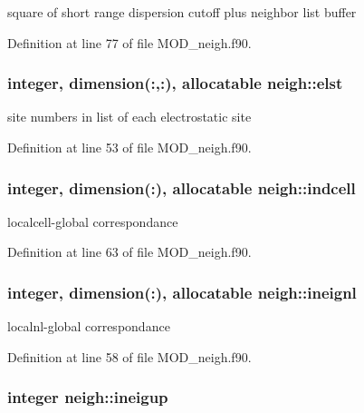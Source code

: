 square of short range dispersion cutoff plus neighbor list buffer 



Definition at line 77 of file M\-O\-D\-\_\-neigh.\-f90.

\hypertarget{classneigh_ab05aa2b85614fd0d577bedd72c64317f}{
\subsubsection[{elst}]{\setlength{\rightskip}{0pt plus 5cm}integer, dimension(\-:,\-:), allocatable neigh\-::elst}}\label{classneigh_ab05aa2b85614fd0d577bedd72c64317f}


site numbers in list of each electrostatic site 



Definition at line 53 of file M\-O\-D\-\_\-neigh.\-f90.

\hypertarget{classneigh_a428039ca05098106f98a9b60f506b247}{
\subsubsection[{indcell}]{\setlength{\rightskip}{0pt plus 5cm}integer, dimension(\-:), allocatable neigh\-::indcell}}\label{classneigh_a428039ca05098106f98a9b60f506b247}


localcell-\/global correspondance 



Definition at line 63 of file M\-O\-D\-\_\-neigh.\-f90.

\hypertarget{classneigh_aea3521da43e6d88ae7b00dba06240210}{
\subsubsection[{ineignl}]{\setlength{\rightskip}{0pt plus 5cm}integer, dimension(\-:), allocatable neigh\-::ineignl}}\label{classneigh_aea3521da43e6d88ae7b00dba06240210}


localnl-\/global correspondance 



Definition at line 58 of file M\-O\-D\-\_\-neigh.\-f90.

\hypertarget{classneigh_a91014fd28ce5849e5f8665c6b4d6f100}{
\subsubsection[{ineigup}]{\setlength{\rightskip}{0pt plus 5cm}integer neigh\-::ineigup}}\label{classneigh_a91014fd28ce5849e5f8665c6b4d6f100}


